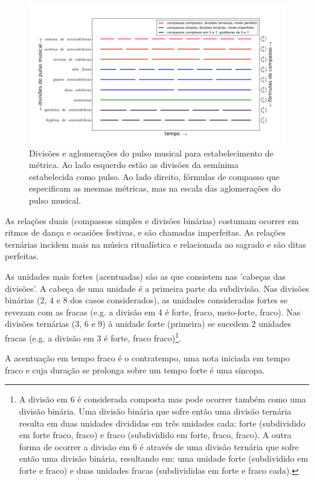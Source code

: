 \begin{figure}[h!]
    \centering
        \includegraphics[width=\textwidth]{figuras/metricaMusical}
    \caption{Divisões e aglomerações do pulso musical para estabelecimento de métrica. Ao lado esquerdo estão as divisões da semínima estabelecida como pulso. Ao lado direito, fórmulas de compasso que especificam as mesmas métricas, mas na escala das aglomerações do pulso musical.}
        \label{fig:pulsoSubAgl}
\end{figure}

As relações duais (compassos simples e divisões binárias) costumam ocorrer em ritmos de dança
e ocasiões festivas, e são chamadas imperfeitas. As relações ternárias
incidem mais na música ritualística e relacionada ao sagrado
e são ditas perfeitas.

As unidades mais fortes (acentuadas) são as que consistem nas 'cabeças das divisões'. A cabeça de uma unidade é a primeira parte da subdivisão. Nas divisões binárias (2, 4 e 8 dos casos considerados),
as unidades consideradas fortes se revezam com as fracas
(e.g. a divisão em 4 é forte, fraco, meio-forte, fraco).
Nas divisões ternárias (3, 6 e 9)
à unidade forte (primeira) se sucedem 2 unidades fracas (e.g. a divisão em 3 é forte, fraco fraco)\footnote{A divisão em 6 é considerada composta
 mas pode ocorrer também como uma divisão binária.
 Uma divisão binária que sofre então uma divisão ternária
 resulta em duas unidades divididas em três unidades cada: forte (subdividido em forte fraco, fraco) e fraco (subdividido em forte, fraco, fraco).
A outra forma de ocorrer a divisão em 6 é através de 
uma divisão ternária que sofre então uma divisão binária, resultando em:
uma unidade forte (subdividido em forte e fraco) e duas unidades fracas (subdivididas em forte e fraco cada).}.

A acentuação em tempo fraco é o contratempo, uma nota iniciada em tempo fraco e cuja duração se prolonga sobre um tempo forte é uma síncopa.

